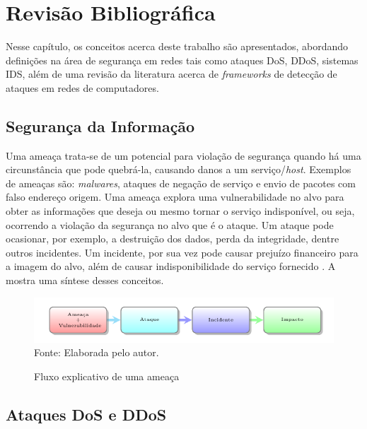 \chapter[Revisão Bibliográfica]{Revisão Bibliográfica}
\label{fundamentacao}
Nesse capítulo, os conceitos acerca deste trabalho são apresentados, abordando definições na área de segurança em redes tais como ataques DoS, DDoS, sistemas IDS, além de uma revisão da literatura acerca de \textit{frameworks} de detecção de ataques em redes de computadores. 
\section{Segurança da Informação}
Uma ameaça trata-se de um potencial para violação de segurança quando há uma circunstância que pode quebrá-la, causando danos a um serviço/\textit{host}. Exemplos de ameaças são: \textit{malwares}, ataques de negação de serviço e envio de pacotes com falso endereço origem. Uma ameaça explora uma vulnerabilidade no alvo para obter as informações que deseja ou mesmo tornar o serviço indisponível, ou seja, ocorrendo a violação da segurança no alvo que é o ataque. Um ataque pode ocasionar, por exemplo, a destruição dos dados, perda da integridade, dentre outros incidentes. Um incidente, por sua vez pode causar prejuízo financeiro para a imagem do alvo, além de causar indisponibilidade do serviço fornecido \cite{kurose}. A  mostra uma síntese desses conceitos.   

 \begin{figure}[ht]
 	\centering
 	\caption{Fluxo explicativo de uma ameaça }
 	\includegraphics[width=1\textwidth]{figs/ameacas.pdf}\\
 	{Fonte: Elaborada pelo autor.}
 	\label{fig:ameacas}
 \end{figure}
 
 \section{Ataques DoS e DDoS}

